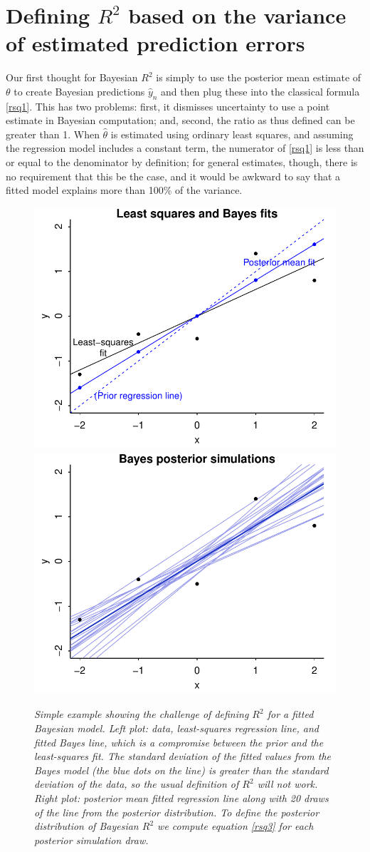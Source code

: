 \documentclass[11pt]{article}
\begin{document}
\section{Defining $R^2$ based on the variance of estimated prediction errors}

Our first thought for Bayesian $R^2$ is simply to use the posterior mean
estimate of $\theta$ to create Bayesian predictions $\hat{y}_n$
and then plug these into the classical formula \eqref{rsq1}.
This has two problems:  first,
it dismisses uncertainty to use a point estimate in Bayesian computation;
and, second, the ratio as thus defined can be greater than 1.  When
$\hat{\theta}$ is estimated using ordinary least squares, and assuming the
regression model includes a constant term, the numerator of \eqref{rsq1} is less
than or equal to the denominator by definition; for general estimates, though, there is
no requirement that this be the case, and it would be awkward to say that a
fitted model explains more than 100\% of the variance.

\begin{figure}
\centerline{\includegraphics[width=.5\textwidth]{rsquared1a.pdf}\includegraphics[width=.5\textwidth]{rsquared1b.pdf}}
\vspace{-.1in}
\caption{\em Simple example showing the challenge of defining $R^2$ for a fitted
Bayesian model.  {\em Left plot:}  data, least-squares regression line, and
fitted Bayes line, which is a compromise between the prior and the least-squares
fit.  The standard deviation of the fitted values from the Bayes model (the blue
dots on the line) is greater than the standard deviation of the data, so the
usual definition of $R^2$ will not work.  {\em Right plot:}  posterior mean
fitted regression line along with 20 draws of the line from the posterior
distribution.  To define the posterior distribution of Bayesian $R^2$ we compute equation
\eqref{rsq3} for each posterior simulation draw.}
\label{rsquared1}
\end{figure}
\end{document}
